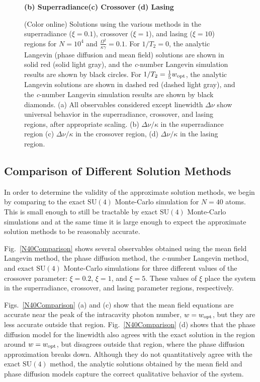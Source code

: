 \documentclass[aps,
twocolumn,
showpacs,
superscriptaddress,groupedaddress]{revtex4}
\begin{document}
\begin{figure}
\begin{center}
	\hspace{-10mm}\textbf{(b) Superradiance}\hspace{33mm}\textbf{(c) Crossover}
  \hspace{37mm}\textbf{(d) Lasing}
\end{center}
		\vspace{-5mm}
\caption{(Color online) Solutions using the various methods in the
superradiance ($\xi=0.1$), crossover ($\xi=1$), and lasing ($\xi=10$)
regions for $N=10^4$ and $\frac{\Omega^2}{\kappa \gamma}=0.1$. For
$1/T_2=0$, the analytic Langevin (phase diffusion and mean field)
solutions are shown in solid red (solid light gray), and the
\textit{c}-number Langevin simulation results are shown by black circles.
For $1/T_2=\frac{1}{5} w_{\rm opt}$, the analytic Langevin solutions are
shown in dashed red (dashed light gray), and the \textit{c}-number
Langevin simulation results are shown by black diamonds. (a) All
observables considered except linewidth $\Delta \nu$ show universal
behavior in the superradiance, crossover, and lasing regions, after
appropriate scaling.  (b) $\Delta \nu / \kappa$ in the superradiance
region (c) $\Delta \nu / \kappa$ in the crossover region, (d) $\Delta
\nu / \kappa$ in the lasing region.}
\label{N10000Comparison}
\end{figure}


\subsection{Comparison of Different Solution Methods}

In order to determine the validity of the approximate solution methods,
we begin by comparing to the exact $\mathrm{SU}(4)$ Monte-Carlo
simulation for $N=40$ atoms. This is small enough to still be tractable
by exact $\mathrm{SU}(4)$ Monte-Carlo simulations and at the same time
it is large enough to expect the approximate solution methods to be
reasonably accurate.

Fig.~\ref{N40Comparison} shows several observables obtained using the
mean field Langevin method, the phase diffusion method, the
\textit{c}-number Langevin method, and exact $\mathrm{SU}(4)$
Monte-Carlo simulations for three different values of the crossover
parameter: $\xi=0.2$, $\xi=1$, and $\xi=5$. These values of $\xi$ place
the system in the superradiance, crossover, and lasing parameter
regions, respectively.


Figs.~\ref{N40Comparison} (a) and (c) show that the mean field equations
are accurate near the peak of the intracavity photon number, $w=w_{\rm
opt}$, but they are less accurate outside that region.
Fig.~\ref{N40Comparison} (d) shows that the phase diffusion model for
the linewidth also agrees with the exact solution in the region around
$w=w_{\rm opt}$, but disagrees outside that region, where the phase
diffusion approximation breaks down.  Although they do not
quantitatively agree with the exact $\mathrm{SU}(4)$ method, the
analytic solutions obtained by the mean field and phase diffusion models
capture the correct qualitative behavior of the system.
\end{document}
